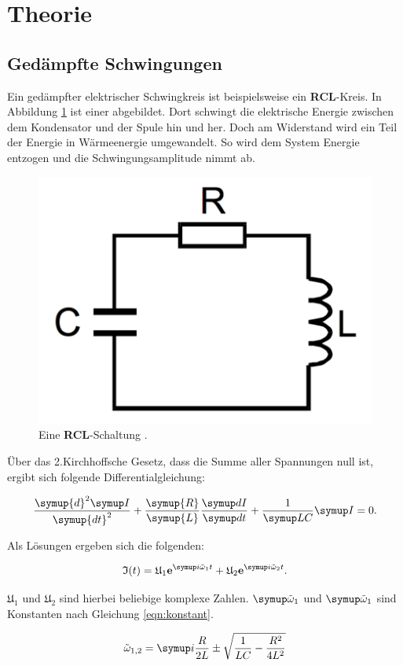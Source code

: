 \section{Theorie}
\label{sec:Theorie}

\subsection{Gedämpfte Schwingungen}
\label{sec:gedschw}

Ein gedämpfter elektrischer Schwingkreis ist beispielsweise ein \textbf{RCL}-Kreis.
In Abbildung \ref{fig:rcl} ist einer abgebildet.
Dort schwingt die elektrische Energie zwischen dem Kondensator und der Spule
hin und her. Doch am Widerstand wird ein Teil der Energie in Wärmeenergie umgewandelt.
So wird dem System Energie entzogen und die Schwingungsamplitude nimmt ab.

\begin{figure}[h]
  \centering
  \includegraphics[height = 3 cm]{RCL.pdf}
  \caption{Eine \textbf{RCL}-Schaltung \cite{anleitung}.}
  \label{fig:rcl}
\end{figure}

Über das 2.Kirchhoffsche Gesetz, dass die Summe aller Spannungen null ist, ergibt
sich folgende Differentialgleichung:

\begin{equation}
  \frac{\symup{d}^2 \g{I}}{\symup{d t}^2} + \frac{\symup{R}}{\symup{L}}
  \frac{\g{d I}}{\g{d t}} + \frac{1}{\g{L C}} \g{I} = 0.
  \label{eqn:dgl}
\end{equation}

Als Lösungen ergeben sich die folgenden:

\begin{equation}
  \mathfrak{I}(t) = \mathfrak{U}_1 \textbf{e}^{\g{i\tilde{\omega}_1t}} + \mathfrak{U}_2
  \textbf{e}^{\g{i\tilde{\omega}_2t}}.
\end{equation}

$\mathfrak{U}_1$ und $\mathfrak{U}_2$ sind hierbei beliebige komplexe Zahlen.
$\g{\tilde{\omega}}_\text{1}$ und $\g{\tilde{\omega}}_\text{1}$ sind Konstanten nach Gleichung
\eqref{eqn:konstant}.

\begin{equation}
  \tilde{\omega}_{1,2} = \g{i\frac{R}{2 L} \pm \sqrt{\frac{1}{L C} - \frac{R^2}{4 L^2}}}
  \label{eqn:konstant}
\end{equation}

